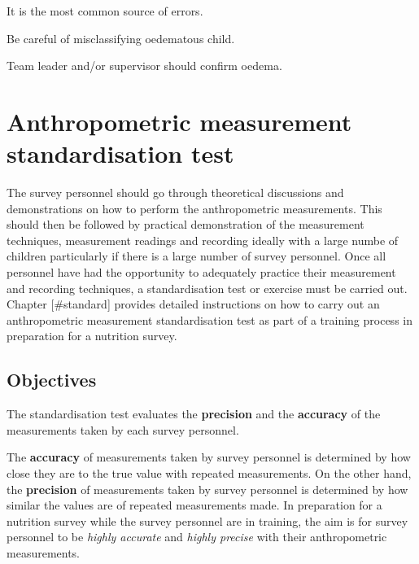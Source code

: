 \documentclass[12pt,]{book}
\theoremstyle{definition}
\theoremstyle{definition}
\theoremstyle{definition}
\theoremstyle{remark}
\begin{document}
\item 

It is the most common source of errors.

\item 

Be careful of misclassifying oedematous child.

\item 

Team leader and/or supervisor should confirm oedema.

\hypertarget{standard}{%
\chapter{Anthropometric measurement standardisation
test}\label{standard}}

The survey personnel should go through theoretical discussions and
demonstrations on how to perform the anthropometric measurements. This
should then be followed by practical demonstration of the measurement
techniques, measurement readings and recording ideally with a large
numbe of children particularly if there is a large number of survey
personnel. Once all personnel have had the opportunity to adequately
practice their measurement and recording techniques, a standardisation
test or exercise must be carried out. Chapter {[}\#standard{]} provides
detailed instructions on how to carry out an anthropometric measurement
standardisation test as part of a training process in preparation for a
nutrition survey.

\hypertarget{objectives}{%
\section{Objectives}\label{objectives}}

The standardisation test evaluates the \textbf{precision} and the
\textbf{accuracy} of the measurements taken by each survey personnel.

The \textbf{accuracy} of measurements taken by survey personnel is
determined by how close they are to the true value with repeated
measurements. On the other hand, the \textbf{precision} of measurements
taken by survey personnel is determined by how similar the values are of
repeated measurements made. In preparation for a nutrition survey while
the survey personnel are in training, the aim is for survey personnel to
be \emph{highly accurate} and \emph{highly precise} with their
anthropometric measurements.
\end{document}
